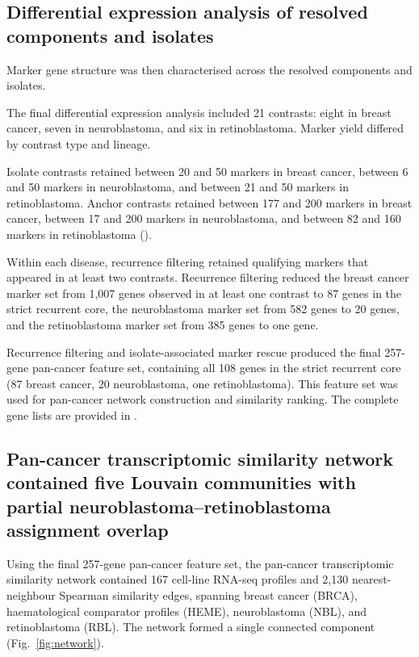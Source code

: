 \subsection{Differential expression analysis of resolved components and isolates}

Marker gene structure was then characterised across the resolved components
and isolates.

The final differential expression analysis included 21 contrasts: eight in breast cancer, seven in neuroblastoma, and six in retinoblastoma. Marker yield differed by contrast type and lineage.

Isolate contrasts retained between 20 and 50 markers in breast cancer, between
6 and 50 markers in neuroblastoma, and between 21 and 50 markers in
retinoblastoma. Anchor contrasts retained between 177 and 200 markers in breast
cancer, between 17 and 200 markers in neuroblastoma, and between 82 and 160
markers in retinoblastoma ().

Within each disease, recurrence filtering retained qualifying markers that
appeared in at least two contrasts. Recurrence filtering reduced the breast
cancer marker set from 1{,}007 genes observed in at least one contrast to 87
genes in the strict recurrent core, the neuroblastoma marker set from 582 genes
to 20 genes, and the retinoblastoma marker set from 385 genes to one gene.

Recurrence filtering and isolate-associated marker rescue produced the final
257-gene pan-cancer feature set, containing all 108 genes in the strict
recurrent core (87 breast cancer, 20 neuroblastoma, one retinoblastoma). This
feature set was used for pan-cancer network construction and similarity ranking.
The complete gene lists are provided in
.


\subsection{Pan-cancer transcriptomic similarity network contained five Louvain communities with partial neuroblastoma--retinoblastoma assignment overlap}

Using the final 257-gene pan-cancer feature set, the pan-cancer transcriptomic
similarity network contained 167 cell-line RNA-seq profiles and 2{,}130
nearest-neighbour Spearman similarity edges, spanning breast cancer (BRCA),
haematological comparator profiles (HEME), neuroblastoma (NBL), and
retinoblastoma (RBL). The network formed a single connected component
(Fig.~\ref{fig:network}).

